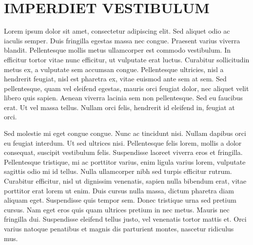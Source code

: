 \chapter{IMPERDIET VESTIBULUM}

Lorem ipsum dolor sit amet, consectetur adipiscing elit. Sed aliquet odio ac iaculis semper. Duis fringilla egestas massa nec congue. Praesent varius viverra blandit. Pellentesque mollis metus ullamcorper est commodo vestibulum. In efficitur tortor vitae nunc efficitur, ut vulputate erat luctus. Curabitur sollicitudin metus ex, a vulputate sem accumsan congue. Pellentesque ultricies, nisl a hendrerit feugiat, nisl est pharetra ex, vitae euismod ante sem at sem. Sed pellentesque, quam vel eleifend egestas, mauris orci feugiat dolor, nec aliquet velit libero quis sapien. Aenean viverra lacinia sem non pellentesque. Sed eu faucibus erat. Ut vel massa tellus. Nullam orci felis, hendrerit id eleifend in, feugiat at orci.

Sed molestie mi eget congue congue. Nunc ac tincidunt nisi. Nullam dapibus orci eu feugiat interdum. Ut sed ultrices nisi. Pellentesque felis lorem, mollis a dolor consequat, suscipit vestibulum felis. Suspendisse laoreet viverra eros et fringilla. Pellentesque tristique, mi ac porttitor varius, enim ligula varius lorem, vulputate sagittis odio mi id tellus. Nulla ullamcorper nibh sed turpis efficitur rutrum. Curabitur efficitur, nisl ut dignissim venenatis, sapien nulla bibendum erat, vitae porttitor erat lorem ut enim. Duis cursus nulla massa, dictum pharetra diam aliquam eget. Suspendisse quis tempor sem. Donec tristique urna sed pretium cursus. Nam eget eros quis quam ultrices pretium in nec metus. Mauris nec fringilla dui. Suspendisse eleifend tellus justo, vel venenatis tortor mattis et. Orci varius natoque penatibus et magnis dis parturient montes, nascetur ridiculus mus.